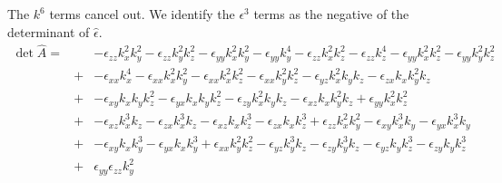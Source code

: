 \documentclass[12pt,a4paper,twoside,openright,BCOR10mm,headsepline,titlepage,abstracton,chapterprefix,final]{scrreprt}
\newcommand\wavenumber{k}
\newcommand\Tensor[1]{\hat{#1}}
\newcommand\permittivity{\Tensor{\epsilon}}
\newcommand\scalarpermittivity{\epsilon}
\begin{document}
The $\wavenumber^6$ terms cancel out. We identify the $\scalarpermittivity^3$ terms as the negative of the determinant of $\permittivity$.
\begin{eqnarray}
 \det \hat{A} =&& 
    - \scalarpermittivity_{zz} \wavenumber_x^2 \wavenumber_y^2 - \scalarpermittivity_{zz} \wavenumber_y^2 \wavenumber_z^2 - \scalarpermittivity_{yy} \wavenumber_x^2 \wavenumber_y^2 - \scalarpermittivity_{yy} \wavenumber_y^4 
    - \scalarpermittivity_{zz} \wavenumber_x^2 \wavenumber_z^2 - \scalarpermittivity_{zz} \wavenumber_z^4 - \scalarpermittivity_{yy} \wavenumber_x^2 \wavenumber_z^2 - \scalarpermittivity_{yy} \wavenumber_y^2 \wavenumber_z^2 
 \nonumber\\&+& 
    - \scalarpermittivity_{xx} \wavenumber_x^4 - \scalarpermittivity_{xx} \wavenumber_x^2 \wavenumber_y^2 - \scalarpermittivity_{xx} \wavenumber_x^2 \wavenumber_z^2 - \scalarpermittivity_{xx} \wavenumber_y^2 \wavenumber_z^2  
    - \scalarpermittivity_{yz} \wavenumber_x^2 \wavenumber_y \wavenumber_z - \scalarpermittivity_{zx} \wavenumber_x \wavenumber_y^2 \wavenumber_z  
 \nonumber\\&+&   
    -  \scalarpermittivity_{xy} \wavenumber_x \wavenumber_y \wavenumber_z^2  
    - \scalarpermittivity_{yx} \wavenumber_x \wavenumber_y \wavenumber_z^2 - \scalarpermittivity_{zy} \wavenumber_x^2 \wavenumber_y \wavenumber_z  
    -  \scalarpermittivity_{xz} \wavenumber_x \wavenumber_y^2 \wavenumber_z   
    +  \scalarpermittivity_{yy} \wavenumber_x^2 \wavenumber_z^2  
 \nonumber\\&+&
    - \scalarpermittivity_{xz} \wavenumber_x^3 \wavenumber_z - \scalarpermittivity_{zx} \wavenumber_x^3 \wavenumber_z 
    - \scalarpermittivity_{xz} \wavenumber_x \wavenumber_z^3 - \scalarpermittivity_{zx} \wavenumber_x \wavenumber_z^3  
    +  \scalarpermittivity_{zz} \wavenumber_x^2 \wavenumber_y^2  
    - \scalarpermittivity_{xy} \wavenumber_x^3 \wavenumber_y - \scalarpermittivity_{yx} \wavenumber_x^3 \wavenumber_y  
 \nonumber\\&+&
    - \scalarpermittivity_{xy} \wavenumber_x \wavenumber_y^3 - \scalarpermittivity_{yx} \wavenumber_x \wavenumber_y^3 
    +  \scalarpermittivity_{xx} \wavenumber_y^2 \wavenumber_z^2  
    - \scalarpermittivity_{yz} \wavenumber_y^3 \wavenumber_z - \scalarpermittivity_{zy} \wavenumber_y^3 \wavenumber_z  
    - \scalarpermittivity_{yz} \wavenumber_y \wavenumber_z^3 - \scalarpermittivity_{zy} \wavenumber_y \wavenumber_z^3  
 \nonumber\\[2ex]
 &+& 
       \scalarpermittivity_{yy} \scalarpermittivity_{zz} \wavenumber_y^2 

\end{eqnarray}
\end{document}
